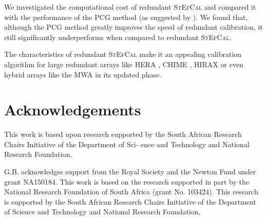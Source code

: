 \documentclass[useAMS,usenatbib]{mn2e}
\begin{document}
We investigated the computational cost of redundant \textsc{StEfCal} and compared it with the performance of the PCG method (as suggested by \cite{Liu2010}).
We found that, although the PCG method greatly improves the speed of redundant calibration, it still significantly underperforms when compared to redundant \textsc{StEfCal}.

The characteristics of redundant \textsc{StEfCal} make it an appealing calibration algorithm for large redundant arrays like HERA \citep{deboer2017}, CHIME \citep{Bandura2014}, HIRAX \citep{Newburgh2016} or even hybrid arrays like the MWA \citep{Tingay2013} in its updated phase.

\section*{Acknowledgements}
This work is based upon research supported by the South
African Research Chairs Initiative of the Department of Sci-
ence and Technology and National Research Foundation.

G.B. acknowledges support from the Royal Society and the Newton Fund under grant NA150184. This work is based on the research supported in part by the National Research Foundation of South Africa (grant No. 103424). This research is supported by the South African Research Chairs Initiative of the Department of Science and Technology and National Research Foundation,






\appendix
\end{document}
